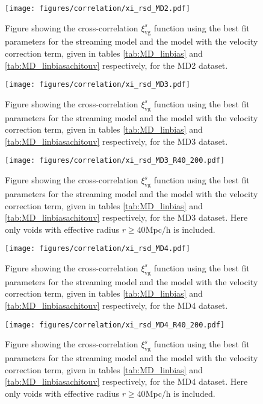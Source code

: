 \begin{figure}[H]
    \texttt{[image: figures/correlation/xi\_rsd\_MD2.pdf]}
    \caption{Figure showing the cross-correlation $\xi^{s}_{\mathrm{vg}}$ function using the best fit parameters for the streaming model and the model with the velocity correction term, given in tables \ref{tab:MD_linbias} and \ref{tab:MD_linbiasachitouv} respectively, for the MD2 dataset.}
    \label{fig:xiMD2}
\end{figure}

\begin{figure}[H]
    \texttt{[image: figures/correlation/xi\_rsd\_MD3.pdf]}
    \caption{Figure showing the cross-correlation $\xi^{s}_{\mathrm{vg}}$ function using the best fit parameters for the streaming model and the model with the velocity correction term, given in tables \ref{tab:MD_linbias} and \ref{tab:MD_linbiasachitouv} respectively, for the MD3 dataset.}
    \label{fig:xiMD3}
\end{figure}

\begin{figure}[H]
    \texttt{[image: figures/correlation/xi\_rsd\_MD3\_R40\_200.pdf]}
    \caption{Figure showing the cross-correlation $\xi^{s}_{\mathrm{vg}}$ function using the best fit parameters for the streaming model and the model with the velocity correction term, given in tables \ref{tab:MD_linbias} and \ref{tab:MD_linbiasachitouv} respectively, for the MD3 dataset. Here only voids with effective radius $r\geq 40$Mpc/h is included.}
    \label{fig:xiMD3R40}
\end{figure}

\begin{figure}[H]
    \texttt{[image: figures/correlation/xi\_rsd\_MD4.pdf]}
    \caption{Figure showing the cross-correlation $\xi^{s}_{\mathrm{vg}}$ function using the best fit parameters for the streaming model and the model with the velocity correction term, given in tables \ref{tab:MD_linbias} and \ref{tab:MD_linbiasachitouv} respectively, for the MD4 dataset.}
    \label{fig:xiMD4}
\end{figure}

\begin{figure}[H]
    \texttt{[image: figures/correlation/xi\_rsd\_MD4\_R40\_200.pdf]}
    \caption{Figure showing the cross-correlation $\xi^{s}_{\mathrm{vg}}$ function using the best fit parameters for the streaming model and the model with the velocity correction term, given in tables \ref{tab:MD_linbias} and \ref{tab:MD_linbiasachitouv} respectively, for the MD4 dataset. Here only voids with effective radius $r\geq 40$Mpc/h is included.}
    \label{fig:xiMD4R40}
\end{figure}

